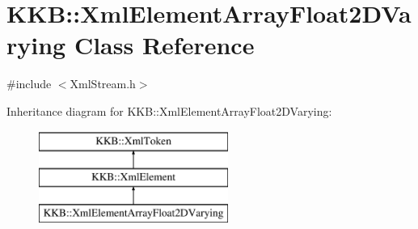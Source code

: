 \hypertarget{class_k_k_b_1_1_xml_element_array_float2_d_varying}{}\section{K\+KB\+:\+:Xml\+Element\+Array\+Float2\+D\+Varying Class Reference}
\label{class_k_k_b_1_1_xml_element_array_float2_d_varying}


{\ttfamily \#include $<$Xml\+Stream.\+h$>$}

Inheritance diagram for K\+KB\+:\+:Xml\+Element\+Array\+Float2\+D\+Varying\+:\begin{figure}[H]
\begin{center}
\leavevmode
\includegraphics[height=3.000000cm]{class_k_k_b_1_1_xml_element_array_float2_d_varying}
\end{center}
\end{figure}
